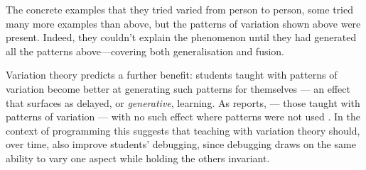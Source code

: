 The concrete examples that they tried varied from person to person, some tried 
many more examples than above, but the patterns of variation shown above were 
present.
Indeed, they couldn't explain the phenomenon until they had generated all the 
patterns above---covering both generalisation and fusion.


Variation theory predicts a further benefit: students taught with patterns of
variation become better at generating such patterns for themselves --- an effect
that surfaces as delayed, or \emph{generative}, learning. As \citeauthor{NCOL}
reports,  --- those taught with patterns of variation --- with no such
effect where patterns were not used \autocite[pp.~227--228]{NCOL}. In the context of
programming this suggests that teaching with variation theory should, over time,
also improve students' debugging, since debugging draws on the same ability to
vary one aspect while holding the others invariant.


